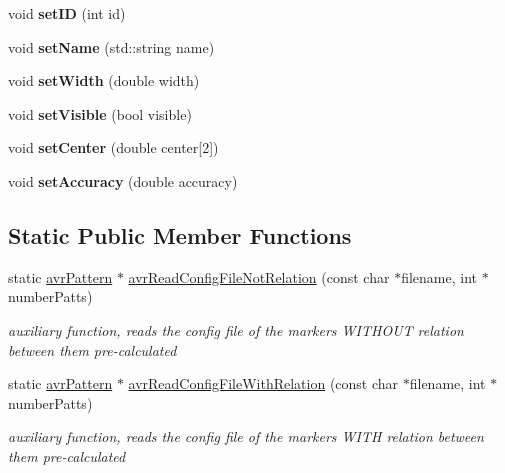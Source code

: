 \begin{DoxyCompactItemize}
\item 
\hypertarget{classavr_pattern_a148de7180212abbdfa81431507c40a9b}{void {\bfseries set\-I\-D} (int id)}\label{classavr_pattern_a148de7180212abbdfa81431507c40a9b}

\item 
\hypertarget{classavr_pattern_acd22f88723f72538e1361ec676443c53}{void {\bfseries set\-Name} (std\-::string name)}\label{classavr_pattern_acd22f88723f72538e1361ec676443c53}

\item 
\hypertarget{classavr_pattern_ae77864f7a3e4c247226f87fa0a4b2693}{void {\bfseries set\-Width} (double width)}\label{classavr_pattern_ae77864f7a3e4c247226f87fa0a4b2693}

\item 
\hypertarget{classavr_pattern_a5f2fa1a6320d44764adfbb8c6e074b87}{void {\bfseries set\-Visible} (bool visible)}\label{classavr_pattern_a5f2fa1a6320d44764adfbb8c6e074b87}

\item 
\hypertarget{classavr_pattern_af91b558c29fde6b897821dd48cf82c9f}{void {\bfseries set\-Center} (double center\mbox{[}2\mbox{]})}\label{classavr_pattern_af91b558c29fde6b897821dd48cf82c9f}

\item 
\hypertarget{classavr_pattern_a990cea7c04156ce2fcbe7295bdc0da80}{void {\bfseries set\-Accuracy} (double accuracy)}\label{classavr_pattern_a990cea7c04156ce2fcbe7295bdc0da80}

\end{DoxyCompactItemize}
\subsection*{Static Public Member Functions}
\begin{DoxyCompactItemize}
\item 
static \hyperlink{classavr_pattern}{avr\-Pattern} $\ast$ \hyperlink{classavr_pattern_aa18165a5bf930e986f3f5051e29c26d9}{avr\-Read\-Config\-File\-Not\-Relation} (const char $\ast$filename, int $\ast$number\-Patts)
\begin{DoxyCompactList}\small\item\em auxiliary function, reads the config file of the markers W\-I\-T\-H\-O\-U\-T relation between them pre-\/calculated \end{DoxyCompactList}\item 
static \hyperlink{classavr_pattern}{avr\-Pattern} $\ast$ \hyperlink{classavr_pattern_a5be573c62e61d14544fe68f9af5f2a95}{avr\-Read\-Config\-File\-With\-Relation} (const char $\ast$filename, int $\ast$number\-Patts)
\begin{DoxyCompactList}\small\item\em auxiliary function, reads the config file of the markers W\-I\-T\-H relation between them pre-\/calculated \end{DoxyCompactList}\end{DoxyCompactItemize}
